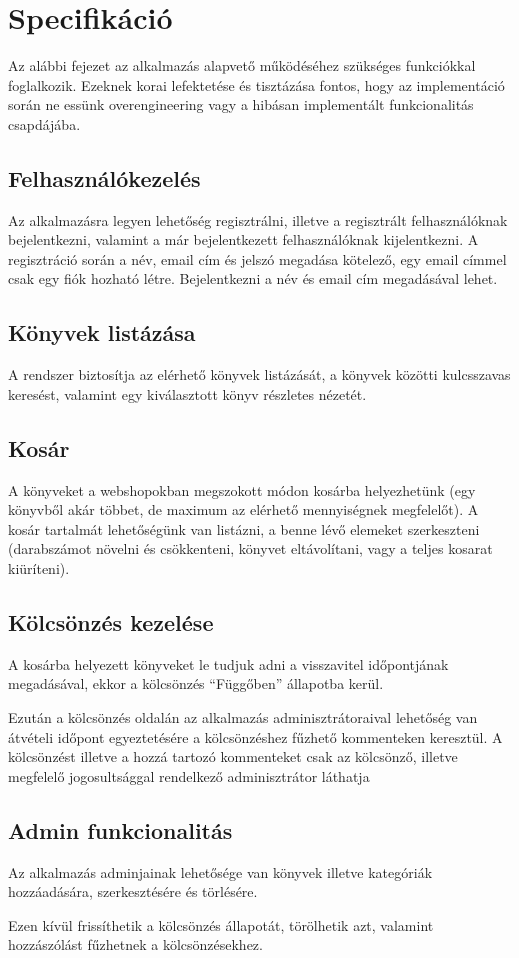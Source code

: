\chapter{Specifikáció}

Az alábbi fejezet az alkalmazás alapvető működéséhez szükséges funkciókkal foglalkozik. Ezeknek korai lefektetése
és tisztázása fontos, hogy az implementáció során ne essünk overengineering\cite{Overengineering} vagy a hibásan implementált funkcionalitás csapdájába.

\section{Felhasználókezelés}

Az alkalmazásra legyen lehetőség regisztrálni, illetve a regisztrált felhasználóknak bejelentkezni, valamint a már bejelentkezett felhasználóknak kijelentkezni.
A regisztráció során a név, email cím és jelszó megadása kötelező, egy email címmel csak egy fiók hozható létre.
Bejelentkezni a név és email cím megadásával lehet.

\section{Könyvek listázása}

A rendszer biztosítja az elérhető könyvek listázását, a könyvek közötti kulcsszavas keresést, valamint
egy kiválasztott könyv részletes nézetét.

\section{Kosár}

A könyveket a webshopokban megszokott módon kosárba helyezhetünk (egy könyvből akár többet, de maximum az elérhető mennyiségnek megfelelőt).
A kosár tartalmát lehetőségünk van listázni, a benne lévő elemeket szerkeszteni (darabszámot növelni és csökkenteni, könyvet eltávolítani, vagy a teljes kosarat kiüríteni).

\section{Kölcsönzés kezelése}

A kosárba helyezett könyveket le tudjuk adni a visszavitel időpontjának megadásával, ekkor a kölcsönzés ``Függőben'' állapotba kerül.

Ezután a kölcsönzés oldalán az alkalmazás adminisztrátoraival lehetőség van átvételi időpont egyeztetésére a kölcsönzéshez fűzhető kommenteken keresztül.
A kölcsönzést illetve a hozzá tartozó kommenteket csak az kölcsönző, illetve megfelelő jogosultsággal rendelkező adminisztrátor láthatja

\section{Admin funkcionalitás}

Az alkalmazás adminjainak lehetősége van könyvek illetve kategóriák hozzáadására, szerkesztésére és törlésére.

Ezen kívül frissíthetik a kölcsönzés állapotát, törölhetik azt, valamint hozzászólást fűzhetnek a kölcsönzésekhez.
